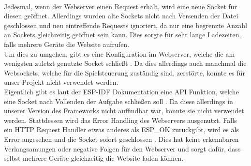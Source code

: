 \documentclass[12pt,a4paper]{article}
\begin{document}
\vspace{1ex}\\
Jedesmal, wenn der Webserver einen Request erhält, wird eine neue Socket für diesen geöffnet. Allerdings wurden alte Sockets nicht nach Versenden der Datei geschlossen und neu eintreffende Requests ignoriert, da nur eine begrenzte Anzahl an Sockets gleichzeitig geöffnet sein kann. Dies sorgte für sehr lange Ladezeiten, falls mehrere Geräte die Website aufrufen.
\vspace{1ex}\\ 
Um dies zu umgehen, gibt es eine Konfiguration im Webserver, welche die am wenigsten zuletzt genutzte Socket schließt \cite{ESSPRESSIF:Reference}. Da dies allerdings auch manchmal die Websockets, welche für die Spielsteuerung zuständig sind, zerstörte, konnte es für unser Projekt nicht verwendet werden. \vspace{1ex}\\
Eigentlich gibt es laut der ESP-IDF Dokumentation eine API Funktion, welche eine Socket nach Vollenden der Aufgabe schließen soll \cite{ESSPRESSIF:Reference}. Da diese allerdings in unserer Version des Frameworks nicht auffindbar war, konnte sie nicht verwendet werden. Stattdessen wird das Error Handling des Webservers ausgenutzt. Falls ein HTTP Request Handler etwas anderes als ESP\_OK zurückgibt, wird es als Error angesehen und die Socket sofort geschlossen \cite{ESSPRESSIF:Reference}. Dies hat keine erkennbaren Verlangsamungen oder negative Folgen für den Webserver und sorgt dafür, dass selbst mehrere Geräte gleichzeitig die Website laden können.
\end{document}
